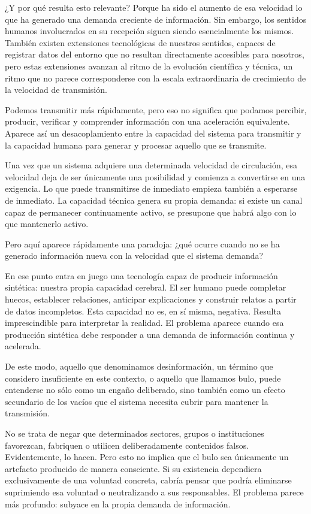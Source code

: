\documentclass[11pt,a4paper]{article}
\begin{document}
¿Y por qué resulta esto relevante? Porque ha sido el aumento de esa velocidad lo que ha generado una demanda creciente de información. Sin embargo, los sentidos humanos involucrados en su recepción siguen siendo esencialmente los mismos. También existen extensiones tecnológicas de nuestros sentidos, capaces de registrar datos del entorno que no resultan directamente accesibles para nosotros, pero estas extensiones avanzan al ritmo de la evolución científica y técnica, un ritmo que no parece corresponderse con la escala extraordinaria de crecimiento de la velocidad de transmisión.

Podemos transmitir más rápidamente, pero eso no significa que podamos percibir, producir, verificar y comprender información con una aceleración equivalente. Aparece así un desacoplamiento entre la capacidad del sistema para transmitir y la capacidad humana para generar y procesar aquello que se transmite.

Una vez que un sistema adquiere una determinada velocidad de circulación, esa velocidad deja de ser únicamente una posibilidad y comienza a convertirse en una exigencia. Lo que puede transmitirse de inmediato empieza también a esperarse de inmediato. La capacidad técnica genera su propia demanda: si existe un canal capaz de permanecer continuamente activo, se presupone que habrá algo con lo que mantenerlo activo.

Pero aquí aparece rápidamente una paradoja: ¿qué ocurre cuando no se ha generado información nueva con la velocidad que el sistema demanda?

En ese punto entra en juego una tecnología capaz de producir información sintética: nuestra propia capacidad cerebral. El ser humano puede completar huecos, establecer relaciones, anticipar explicaciones y construir relatos a partir de datos incompletos. Esta capacidad no es, en sí misma, negativa. Resulta imprescindible para interpretar la realidad. El problema aparece cuando esa producción sintética debe responder a una demanda de información continua y acelerada.

De este modo, aquello que denominamos desinformación, un término que considero insuficiente en este contexto, o aquello que llamamos bulo, puede entenderse no sólo como un engaño deliberado, sino también como un efecto secundario de los vacíos que el sistema necesita cubrir para mantener la transmisión.

No se trata de negar que determinados sectores, grupos o instituciones favorezcan, fabriquen o utilicen deliberadamente contenidos falsos. Evidentemente, lo hacen. Pero esto no implica que el bulo sea únicamente un artefacto producido de manera consciente. Si su existencia dependiera exclusivamente de una voluntad concreta, cabría pensar que podría eliminarse suprimiendo esa voluntad o neutralizando a sus responsables. El problema parece más profundo: subyace en la propia demanda de información.
\end{document}

